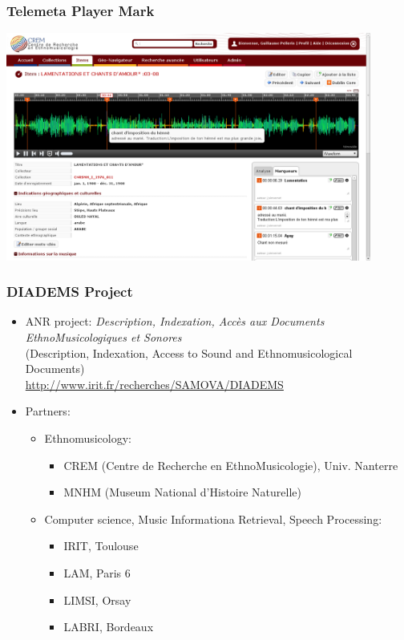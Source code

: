 \documentclass[10pt, final, hyperref, table]{beamer}
\begin{document}
\begin{frame}\frametitle{Telemeta Player Mark}
  \vspace{-1cm}
  \begin{center}
    \includegraphics[width=12cm]{../../Common/img/shots/player_mark.png}
  \end{center}

\end{frame}
\begin{frame}
\frametitle{DIADEMS Project}
\begin{itemize}
\item ANR project: \emph{Description, Indexation, Accès aux Documents EthnoMusicologiques et Sonores} \\
(Description, Indexation, Access to Sound and Ethnomusicological Documents)\\
\url{http://www.irit.fr/recherches/SAMOVA/DIADEMS}
\item Partners:
  \begin{itemize}
  \item Ethnomusicology:
    \begin{itemize}
    \item CREM (Centre de Recherche en EthnoMusicologie),
      Univ. Nanterre
    \item MNHM (Museum National d'Histoire Naturelle)
    \end{itemize}
  \item Computer science, Music Informationa Retrieval, Speech Processing:
    \begin{itemize}
    \item IRIT, Toulouse
    \item LAM, Paris 6
    \item LIMSI, Orsay
    \item LABRI, Bordeaux
    \end{itemize}

  \end{itemize}

\end{itemize}
\end{frame}
\end{document}
